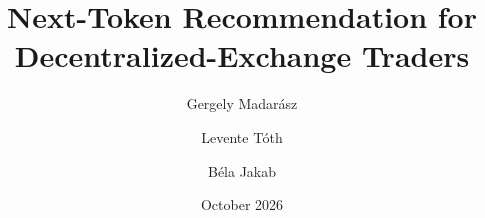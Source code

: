 \newcommand{\code}[1]{\texttt{#1}}
\newcommand{\source}[1]{\par\vfill\hfill{\scriptsize\color{grey}#1}}
\newcommand{\stat}[2]{%
  \begin{tikzpicture}
    \node[fill=mist,rounded corners=3pt,minimum width=2.55cm,minimum height=1.75cm,align=center,inner sep=4pt]
      {{\Large\bfseries\color{navy}#1}\\[2pt]{\scriptsize\color{ink}#2}};
  \end{tikzpicture}}
\newcommand{\takeaway}[1]{%
  \par\vspace{4pt}\noindent
  \begin{tikzpicture}
    \node[fill=sand,draw=orange,line width=0.6pt,rounded corners=3pt,text width=0.92\textwidth,inner sep=6pt,align=left]
      {\small\textbf{\color{orange}Takeaway.} #1};
  \end{tikzpicture}}
\newcommand{\done}{{\color{teal}\faCheckCircle\ done}}
\newcommand{\planned}{{\color{orange}\faClock[regular]\ planned}}


\title{Next-Token Recommendation for Decentralized-Exchange Traders}
\author{Gergely Madarász \and Levente Tóth \and Béla Jakab}
\date{October 2026}

